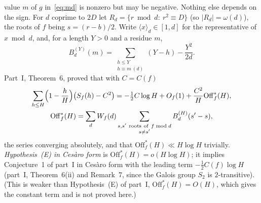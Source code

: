 \documentclass[11pt,a4paper]{article}
\theoremstyle{remark}\newtheorem{remark}[theorem]{Remark}
\newcommand{\Off}{\mathrm{Off}}\newcommand{\e}{\mathrm{e}}
\newcommand{\rep}[2]{\langle #1\rangle_{#2}}
\begin{document}
value $m$ of $g$ in~\eqref{eq:md} is nonzero but may be negative. Nothing else depends on the sign. For $d$ coprime to $2D$ let $R_d=\{r\bmod d:\ r^2\equiv D\}$ (so $|R_d|=\omega(d)$),
the roots of $f$ being $s=(r-b)/2$. Write $\rep xd\in[1,d]$ for the representative of $x\bmod d$, and, for a length
$Y>0$ and a residue $m$,
\begin{equation}\label{eq:B}
B^{(Y)}_d(m)=\sum_{\substack{h\le Y\\ h\equiv m\ (d)}}(Y-h)-\frac{Y^2}{2d}.
\end{equation}
Part~I, Theorem~6, proved that with $C=C(f)$
\begin{equation}\label{eq:cesaro}
\begin{gathered}
\sum_{h\le H}\Bigl(1-\frac hH\Bigr)\bigl(S_f(h)-C^2\bigr)=-\tfrac12C\log H+O_f(1)+\frac{C^2}H\Off^\ast_f(H),\\
\Off^\ast_f(H)=\sum_{d}W_f(d)\sum_{\substack{s,s'\ \mathrm{roots\ of\ }f\bmod d\\ s\ne s'}}B^{(H)}_d(s'-s),
\end{gathered}
\end{equation}
the series converging absolutely, and that $\Off^\ast_f(H)\ll H\log H$ trivially. \emph{Hypothesis~(E) in
Ces\`aro form} is $\Off^\ast_f(H)=o(H\log H)$; it implies Conjecture~1 of part~I in Ces\`aro form with the leading
term $-\tfrac12C(f)\log H$ (part~I, Theorem~6(ii) and Remark~7, since the Galois group $S_2$ is $2$-transitive). (This is weaker than Hypothesis~(E) of part~I, $\Off^\ast_f(H)=O(H)$, which gives the constant term and is not proved here.)
\end{document}

